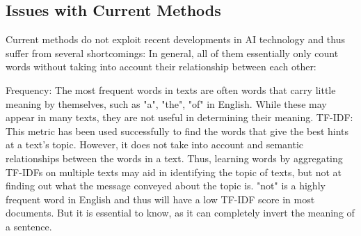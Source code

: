 \subsection{Issues with Current Methods}
Current methods do not exploit recent developments in AI technology and thus suffer from several shortcomings:
In general, all of them essentially only count words without taking into account their relationship between each other:

Frequency: The most frequent words in texts are often words that carry little meaning by themselves, such as "a", "the", "of" in English.
While these may appear in many texts, they are not useful in determining their meaning.
TF-IDF: This metric has been used successfully to find the words that give the best hints at a text's topic.
However, it does not take into account and semantic relationships between the words in a text.
Thus, learning words by aggregating TF-IDFs on multiple texts may aid in identifying the topic of texts, but not at finding out what the message conveyed about the topic is.
"not" is a highly frequent word in English and thus will have a low TF-IDF score in most documents. But it is essential to know, as it can completely invert the meaning of a sentence.


